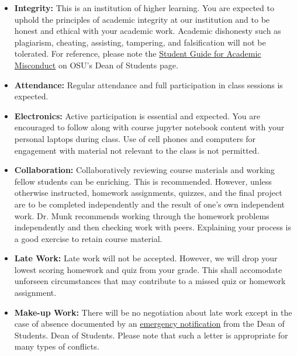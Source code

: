 \documentclass[11pt, a4paper]{article}
\begin{document}
\begin{itemize}
\item[] \textbf{Integrity:} This is an institution of higher
learning. You are expected to uphold the principles of academic 
integrity at our institution and to be honest and ethical with your academic work. 
Academic dishonesty such as plagiarism, cheating, assisting, tampering, and falsification will not be 
tolerated. 
For reference, please note the \href{https://studentlife.oregonstate.edu/studentconduct/academic-misconduct-students}{Student Guide for Academic Misconduct} 
on OSU's Dean of Students page. 

\item[] \textbf{Attendance:} Regular attendance and full participation in class sessions is expected. 

\item[] \textbf{Electronics:} Active participation is essential and expected. 
  You are encouraged to follow along with course jupyter notebook content with 
  your personal laptops during class. Use of cell phones and computers for 
  engagement with material not relevant to the class is not permitted. 

\item[] \textbf{Collaboration:} Collaboratively reviewing course materials and
  working fellow students can be enriching.  This is
  recommended.  However, unless otherwise instructed, homework assignments, quizzes, and the final project are
  to be completed independently and 
  the result of one's own independent work. Dr. Munk recommends working through
  the homework problems independently and then checking work with peers. Explaining your
  process is a good exercise to retain course material.

\item[] \textbf{Late Work:} Late work will not be accepted. However, we will drop your lowest scoring homework and quiz from your grade. 
This shall accomodate unforseen circumstances that may contribute to a missed quiz or homework assignment.

\item[] \textbf{Make-up Work:} There will be no negotiation about late work
        except in the case of absence documented by an 
\href{https://studentlife.oregonstate.edu/emergency-notifications}{emergency notification} from the Dean of Students.
        Dean of Students. Please note that such a letter is appropriate for many
        types of conflicts. 


\end{itemize}
\end{document}
